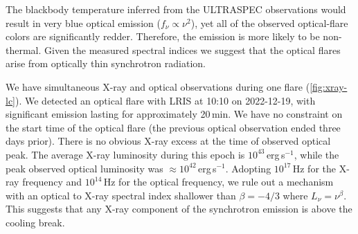 \documentclass{nature_plusfigure}
\begin{document}
\begin{methods}
The blackbody temperature inferred from the ULTRASPEC observations would result in very blue optical emission ($f_\nu\propto\nu^2$), yet all of the observed optical-flare colors are significantly redder. Therefore, the emission is more likely to be non-thermal. Given the measured spectral indices we suggest that the optical flares arise from optically thin synchrotron radiation. 

We have simultaneous X-ray and optical observations during one flare (\ref{fig:xray-lc}). We detected an optical flare with LRIS at 10:10 on 2022-12-19, with significant emission lasting for approximately 20\,min. We have no constraint on the start time of the optical flare (the previous optical observation ended three days prior). There is no obvious X-ray excess at the time of observed optical peak. The average X-ray luminosity during this epoch is $10^{43}\,$erg\,s$^{-1}$, while the peak observed optical luminosity was $\approx 10^{42}$\,erg\,s$^{-1}$.
Adopting $10^{17}\,$Hz for the X-ray frequency and $10^{14}\,$Hz for the optical frequency, we rule out a mechanism with an optical to X-ray spectral index shallower than $\beta=-4/3$ where $L_\nu = \nu^{\beta}$. This suggests that any X-ray component of the synchrotron emission is above the cooling break.





\end{methods}
\end{document}
